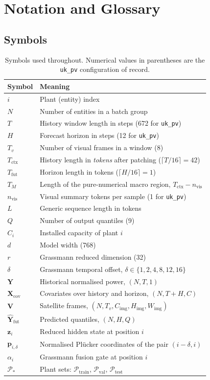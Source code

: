 \chapter{Notation and Glossary}
\label{app:notation}

\section{Symbols}

\begin{table}[h!]
\centering
\small
\begin{tabular}{l l}
\hline
\textbf{Symbol} & \textbf{Meaning} \\
\hline
$i$ & Plant (entity) index \\
$N$ & Number of entities in a batch group \\
$T$ & History window length in steps (672 for \texttt{uk\_pv}) \\
$H$ & Forecast horizon in steps (12 for \texttt{uk\_pv}) \\
$T_v$ & Number of visual frames in a window (8) \\
$T_{\text{ctx}}$ & History length in \emph{tokens} after patching ($\lceil T/16 \rceil = 42$) \\
$T_{\text{fut}}$ & Horizon length in tokens ($\lceil H/16 \rceil = 1$) \\
$T_M$ & Length of the pure-numerical macro region, $T_{\text{ctx}} - n_{\text{vis}}$ \\
$n_{\text{vis}}$ & Visual summary tokens per sample (1 for \texttt{uk\_pv}) \\
$L$ & Generic sequence length in tokens \\
$Q$ & Number of output quantiles (9) \\
$C_i$ & Installed capacity of plant $i$ \\
$d$ & Model width (768) \\
$r$ & Grassmann reduced dimension (32) \\
$\delta$ & Grassmann temporal offset, $\delta \in \{1,2,4,8,12,16\}$ \\
$\mathbf{Y}$ & Historical normalised power, $(N,T,1)$ \\
$\mathbf{X}_{\text{cov}}$ & Covariates over history and horizon, $(N,T+H,C)$ \\
$\mathbf{V}$ & Satellite frames, $(N,T_v,C_{\text{img}},H_{\text{img}},W_{\text{img}})$ \\
$\hat{\mathbf{Y}}_{\text{fut}}$ & Predicted quantiles, $(N,H,Q)$ \\
$\mathbf{z}_i$ & Reduced hidden state at position $i$ \\
$\mathbf{p}_{i,\delta}$ & Normalised Pl\"ucker coordinates of the pair $(i-\delta, i)$ \\
$\alpha_i$ & Grassmann fusion gate at position $i$ \\
$\mathcal{P}_{\ast}$ & Plant sets: $\mathcal{P}_{\text{train}}$,
$\mathcal{P}_{\text{val}}$, $\mathcal{P}_{\text{test}}$ \\
\hline
\end{tabular}
\caption{Symbols used throughout. Numerical values in parentheses are the
\texttt{uk\_pv} configuration of record.}
\label{tab:notation}
\end{table}

